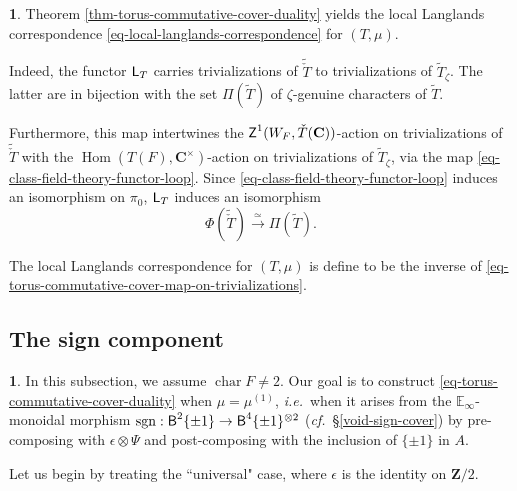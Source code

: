\documentclass[10pt,english,reqno]{amsart}
\newcommand{\integers}{\mathbf Z}
\newcommand{\complexes}{\mathbf C}
\newcommand{\characteristic}{\operatorname{char}}
\newcommand{\cycle}{\textnormal{\textsf{Z}}}
\newcommand{\Hom}{\operatorname{Hom}}
\newcommand{\deloop}{\textnormal{\textsf{B}}}
\newcommand{\sgn}{\mathrm{sgn}}
\newcommand{\Langlands}{\textnormal{\textsf{L}}}
\theoremstyle{definition}
\numberwithin{equation}{section}
\newtheorem{untitledsubsubsection}[subsubsection]{}
\newenvironment{void}
{\begin{untitledsubsubsection}}
{\end{untitledsubsubsection}}
\begin{document}

\begin{void}
\label{void-torus-commutative-cover-local-langlands-correspondence}
Theorem \ref{thm-torus-commutative-cover-duality} yields the local Langlands correspondence \eqref{eq-local-langlands-correspondence} for $(T, \mu)$.

Indeed, the functor $\Langlands_T$ carries trivializations of $\widetilde{\check T}$ to trivializations of $\widetilde T_{\zeta}$. The latter are in bijection with the set $\Pi(\widetilde T)$ of $\zeta$-genuine characters of $\widetilde T$.

Furthermore, this map intertwines the $\cycle^1(W_F, \check T(\complexes))$-action on trivializations of $\widetilde{\check T}$ with the $\Hom(T(F), \complexes^{\times})$-action on trivializations of $\widetilde T_{\zeta}$, via the map \eqref{eq-class-field-theory-functor-loop}. Since \eqref{eq-class-field-theory-functor-loop} induces an isomorphism on $\pi_0$, $\Langlands_T$ induces an isomorphism
\begin{equation}
\label{eq-torus-commutative-cover-map-on-trivializations}
\Phi(\widetilde{\check T}) \xrightarrow{\simeq} \Pi(\widetilde T).
\end{equation}

The local Langlands correspondence for $(T, \mu)$ is define to be the inverse of \eqref{eq-torus-commutative-cover-map-on-trivializations}.
\end{void}



\subsection{The sign component}
\label{sec-sign-cover}

\begin{void}
In this subsection, we assume $\characteristic F\neq 2$. Our goal is to construct \eqref{eq-torus-commutative-cover-duality} when $\mu = \mu^{(1)}$, \emph{i.e.}~when it arises from the $\mathbb E_{\infty}$-monoidal morphism $\sgn : \deloop^2\{\pm 1\} \rightarrow \deloop^4\{\pm 1\}^{\otimes 2}$ (\emph{cf.}~\S\ref{void-sign-cover}) by pre-composing with $\epsilon\otimes\Psi$ and post-composing with the inclusion of $\{\pm 1\}$ in $A$.

Let us begin by treating the ``universal" case, where $\epsilon$ is the identity on $\integers/2$.
\end{void}
\end{document}
